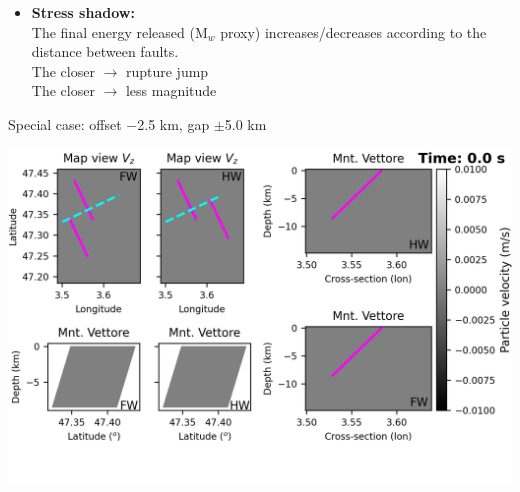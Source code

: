 \documentclass{beamer}
\begin{document}
\begin{frame}
\begin{minipage}{0.53\linewidth}
\begin{itemize}
   \item[\ding{43}] {\scriptsize \textbf{Stress shadow:} \\
                    \vskip 0.1cm
                    The final energy released (M$_w$ proxy) increases/decreases according to the distance between faults.\\
                    \vskip 0.3cm \pause
                    The closer \quad $\longrightarrow$ \quad rupture jump \\ 
                    \pause
                    The closer \quad $\longrightarrow$ \quad less magnitude 
                    }
  \end{itemize}
 \end{minipage}
  
\end{frame}


\begin{frame}
 {Special case: offset $-$2.5 km, gap $\pm$5.0 km}

\begin{center}
    \includegraphics[width=1\linewidth]{images/horizontal_delta_00000}
\end{center}
 
\end{frame}
\end{document}
